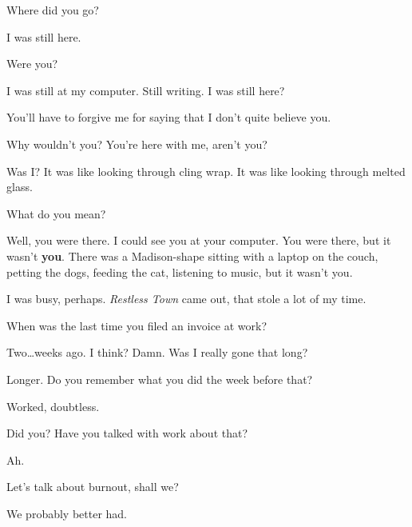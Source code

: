 \label{ally:29}
\begin{paracol}{2}
  \begin{leftcolumn}
\begin{ally}
Where did you go?
\end{ally}
I was still here.

\begin{ally}
Were you?
\end{ally}
I was still at my computer. Still writing. I was still here?

\begin{ally}
You'll have to forgive me for saying that I don't quite believe you.
\end{ally}
Why wouldn't you? You're here with me, aren't you?

\begin{ally}
Was I? It was like looking through cling wrap. It was like looking through melted glass.
\end{ally}
What do you mean?

\begin{ally}
Well, you were there. I could see you at your computer. You were there, but it wasn't \textbf{you}. There was a Madison-shape sitting with a laptop on the couch, petting the dogs, feeding the cat, listening to music, but it wasn't you.
\end{ally}
I was busy, perhaps. \emph{Restless Town} came out, that stole a lot of my time.

\begin{ally}
When was the last time you filed an invoice at work?
\end{ally}
Two\ldots{}weeks ago. I think? Damn. Was I really gone that long?

\begin{ally}
Longer. Do you remember what you did the week before that?
\end{ally}
Worked, doubtless.

\begin{ally}
Did you? Have you talked with work about that?
\end{ally}
Ah.

\begin{ally}
Let's talk about burnout, shall we?
\end{ally}
We probably better had.
\newpage
\end{leftcolumn}
\end{paracol}
